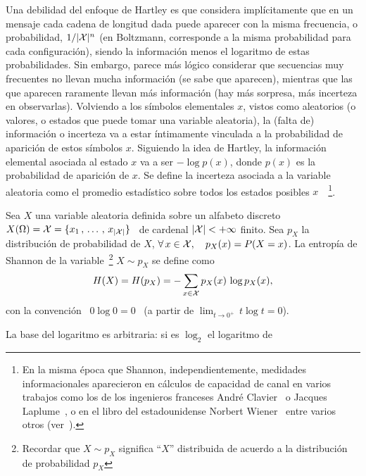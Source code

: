 Una debilidad del enfoque de Hartley es que considera impl\'icitamente que en un
mensaje cada cadena  de longitud dada puede aparecer con  la misma frecuencia, o
probabilidad, $1/|\mathcal{X}|^n$ (en Boltzmann, corresponde a la misma probabilidad para
cada  configuraci\'on), siendo  la  informaci\'on menos  el  logaritmo de  estas
probabilidades.  Sin  embargo, parece  m\'as l\'ogico considerar  que secuencias
muy frecuentes  no llevan mucha  informaci\'on (se sabe que  aparecen), mientras
que las que  aparecen raramente llevan m\'as informaci\'on  (hay m\'as sorpresa,
m\'as incerteza  en observarlas).  Volviendo  a los s\'imbolos  elementales $x$,
vistos  como aleatorios  (o  valores, o  estados que  puede  tomar una  variable
aleatoria), la  (falta de)  informaci\'on o incerteza  va a  estar \'intimamente
vinculada a la probabilidad de aparici\'on de estos s\'imbolos $x$. Siguiendo la
idea de Hartley, la informaci\'on elemental asociada al estado $x$ va a ser $-
\log p(x)$, donde $p(x)$ es la  probabilidad de aparici\'on de $x$.  Se define la
incerteza asociada a la variable  aleatoria como el promedio estad\'istico sobre
todos   los   estados   posibles  $x$~\cite{Sha48,   ShaWea64}~\footnote{En   la
misma  \'epoca   que  Shannon,  independientemente,   medidades  informacionales
aparecieron en c\'alculos  de capacidad de canal en varios  trabajos como los de
los    ingenieros    franceses    Andr\'e   Clavier~\cite{Cla48}    o    Jacques
Laplume~\cite{Lap48},    o   en    el   libro    del   estadounidense    Norbert
Wiener~\cite[Cap.~III]{Wie48}  entre  varios   otros  (ver~\cite[y  Ref.]{Ver98,
Lun02, RioMag14, FlaRio16, RioFla17, Che17}).}.
%
\begin{definicion}
\label{Def:SZ:Shannon}
%
  Sea  $X$  una  variable  aleatoria  definida  sobre  un  alfabeto  discreto  \
  $X(\Omega) = \mathcal{X}  = \{ x_1 \,  , \, \ldots \,  , \, x_{|\mathcal{X}|} \}$  \ de cardenal
  $|\mathcal{X}|  < +  \infty$ finito.  Sea $p_X$  la distribuci\'on  de probabilidad  de
  $X$, \ie $  \forall \, x \in \mathcal{X},  \quad p_X(x) = P(X = x)$.   La entrop\'ia de
  Shannon de la  variable~\footnote{Recordar que $X \sim  p_X$ significa ``$X$''
  distribuida de acuerdo a la distribuci\'on de probabilidad $p_X$} $X \sim p_X$
  se define como
  \[
    H(X) = H(p_X) = - \sum_{x \in \mathcal{X}} p_X(x) \, \log p_X(x),
  \]
  con   la   convenci\'on   \   $0   \log    0   =   0$   \   (a   partir   de
  $\displaystyle \lim_{t \to 0^+} \, t \log t = 0$).
\end{definicion}
%
\noindent La  base del logaritmo es  arbitraria: si es $\log_2$  el logaritmo de
